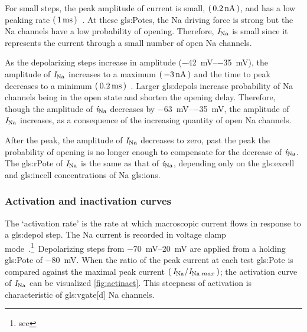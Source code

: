 \documentclass[class={myRUCProject}, crop=false]{standalone}
\begin{document}
For small steps, the peak amplitude of current is small, \(\left(\,\qty{0.2}{\nano\ampere}\,\right)\), and has a low peaking rate \(\left(\,\qty{1}{\milli\second}\,\right)\)~\cite{Hammond2015ch4}. At these \glspl{gls:Pote}, the \gls{Na} driving force is strong but the \gls{Na} channels have a low probability of opening. Therefore, \(\mathit{I}_\mathrm{Na}\) is small since it represents the current through a small number of open \gls{Na} channels. 

As the depolarizing steps increase in amplitude (\qtyrange{-42}{-35}{\mV}), the amplitude of \(\mathit{I}_\mathrm{Na}\) increases to a maximum \(\br{\qty{-3}{\nA}}\) and the time to peak decreases to a minimum \(\br{\qty{0.2}{\ms}}\)~\cite{Hammond2015ch4}. 
Larger \glspl{gls:depol} increase probability of \gls{Na} channels being in the open state and shorten the opening delay. 
Therefore, though the amplitude of \(\mathit{i}_\mathrm{Na}\) decreases by \qtyrange{-63}{-35}{\mV}, the amplitude of \(\mathit{I}_\mathrm{Na}\) increases, as a consequence of the increasing quantity of open \gls{Na} channels. 

After the peak, the amplitude of \(\mathit{I}_\mathrm{Na}\) decreases to zero, past the peak the probability of opening is no longer enough to compensate for the decrease of \(\mathit{i}_\mathrm{Na}\). 
The \gls{gls:rPote} of \(\mathit{I}_\mathrm{Na}\) is the same as that of \(\mathit{i}_\mathrm{Na}\), depending only on the \gls{gls:excell} and \gls{gls:incell} concentrations of \gls{Na} \glspl{gls:ion}.


\subsubsection{Activation and inactivation curves}
The `activation rate' is the rate at which macroscopic current flows in response to a \gls{gls:depol} step. 
The \gls{Na} current is recorded in voltage clamp mode~\cite{Hammond2015ch4}.\footnote{see }~Depolarizing steps from \qtyrange{-70}{20}{\mV} are applied from a holding \gls{gls:Pote} of \qty{-80}{\mV}. When the ratio of the peak current at each test \gls{gls:Pote} is compared against the maximal peak current \(\left(\,\mathit{I}_\mathrm{Na}/\mathit{I}_\mathrm{Na}{\,}_{max}\,\right)\); the activation curve of \(\mathit{I}_\mathrm{Na}\) can be visualized \cref{fig:actinact}. 
This steepness of activation is characteristic of \gls{gls:vgate}[d] \gls{Na} channels. 
\end{document}
